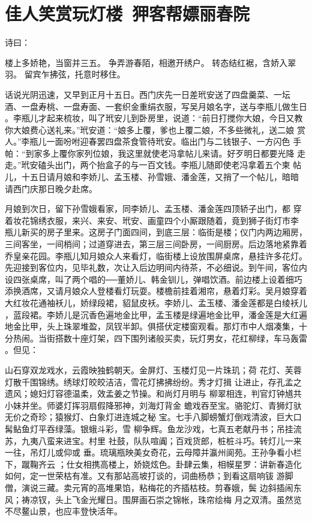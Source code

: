 \chapter{佳人笑赏玩灯楼~狎客帮嫖丽春院}

诗曰：

楼上多娇艳，当窗并三五。
争弄游春陌，相邀开绣户。
转态结红裾，含娇入翠羽。
留宾乍拂弦，托意时移住。

话说光阴迅速，又早到正月十五日。西门庆先一日差玳安送了四盘羹菜、一坛
酒、一盘寿桃、一盘寿面、一套织金重绢衣服，写吴月娘名字，送与李瓶儿做生日
。李瓶儿才起来梳妆，叫了玳安儿到卧房里，说道：“前日打搅你大娘，今日又教
你大娘费心送礼来。”玳安道：“娘多上覆，爹也上覆二娘，不多些微礼，送二娘
赏人。”李瓶儿一面吩咐迎春罢四盘茶食管待玳安。临出门与二钱银子、一方闪色
手帕：“到家多上覆你家列位娘，我这里就使老冯拿帖儿来请。好歹明日都要光降
走走。”玳安磕头出门，两个抬盒子的与一百文钱。李瓶儿随即使老冯拿着五个柬
帖儿，十五日请月娘和李娇儿、孟玉楼、孙雪娥、潘金莲，又捎了一个帖儿，暗暗
请西门庆那日晚夕赴席。

月娘到次日，留下孙雪娥看家，同李娇儿、孟玉楼、潘金莲四顶轿子出门，都
穿着妆花锦绣衣服，来兴、来安、玳安、画童四个小厮跟随着，竟到狮子街灯市李
瓶儿新买的房子里来。这房子门面四间，到底三层：临街是楼；仪门内两边厢房，
三间客坐，一间梢间；过道穿进去，第三层三间卧房，一间厨房。后边落地紧靠着
乔皇亲花园。李瓶儿知月娘众人来看灯，临街楼上设放围屏桌席，悬挂许多花灯。
先迎接到客位内，见毕礼数，次让入后边明间内待茶，不必细说。到午间，客位内
设四张桌席，叫了两个唱的──董娇儿、韩金钏儿，弹唱饮酒。前边楼上设着细巧
添换酒席，又请月娘众人登楼看灯玩耍。楼檐前挂着湘帘，悬着灯彩。吴月娘穿着
大红妆花通袖袄儿，娇绿段裙，貂鼠皮袄。李娇儿、孟玉楼、潘金莲都是白绫袄儿
，蓝段裙。李娇儿是沉香色遍地金比甲，孟玉楼是绿遍地金比甲，潘金莲是大红遍
地金比甲，头上珠翠堆盈，凤钗半卸。俱搭伏定楼窗观看。那灯市中人烟凑集，十
分热闹。当街搭数十座灯架，四下围列诸般买卖，玩灯男女，花红柳绿，车马轰雷
。但见：

山石穿双龙戏水，云霞映独鹤朝天。金屏灯、玉楼灯见一片珠玑；荷
花灯、芙蓉灯散千围锦绣。绣球灯皎皎洁洁，雪花灯拂拂纷纷。秀才灯揖
让进止，存孔孟之遗风；媳妇灯容德温柔，效孟姜之节操。和尚灯月明与
柳翠相连，判官灯钟馗共小妹并坐。师婆灯挥羽扇假降邪神，刘海灯背金
蟾戏吞至宝。骆驼灯、青狮灯驮无价之奇珍；猿猴灯、白象灯进连城之秘
宝。七手八脚螃蟹灯倒戏清波，巨大口髯鲇鱼灯平吞绿藻。银蛾斗彩，雪
柳争辉。鱼龙沙戏，七真五老献丹书；吊挂流苏，九夷八蛮来进宝。村里
社鼓，队队喧阗；百戏货郎，桩桩斗巧。转灯儿一来一往，吊灯儿或仰或
垂。琉璃瓶映美女奇花，云母障并瀛州阆苑。王孙争看小栏下，蹴鞠齐云
；仕女相携高楼上，娇娆炫色。卦肆云集，相幙星罗：讲新春造化
如何，定一世荣枯有准。又有那站高坡打谈的，词曲杨恭；到看这扇响钹
游脚僧，演说三藏。卖元宵的高堆果馅，粘梅花的齐插枯枝。剪春娥，鬓
边斜插闹东风；祷凉钗，头上飞金光耀日。围屏画石崇之锦帐，珠帘绘梅
月之双清。虽然览不尽鳌山景，也应丰登快活年。

